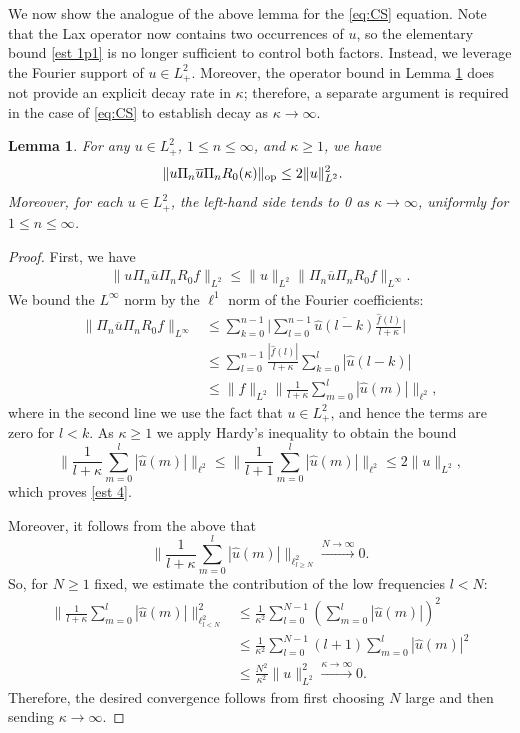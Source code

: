 \documentclass [11pt] {article}
\newtheorem{lem}[thm]{Lemma}
\newcommand{\<}{\langle}
\renewcommand{\>}{\rangle}
\newcommand{\wh}[1]{\widehat{#1}}
\newcommand{\ol}[1]{\overline{#1}}
\newcommand{\op}{\textup{op}}
\begin{document}

We now show the analogue of the above lemma for the \eqref{eq:CS} equation. 
Note that the Lax operator now contains two occurrences of $u$, so the elementary bound \eqref{est 1p1} is no longer sufficient to control both factors. Instead, we leverage the Fourier support of $u\in L^2_+$.  Moreover, the operator bound in Lemma \ref{lem:CS} does not provide an explicit decay rate in $\kappa$; therefore, a separate argument is required in the case of \eqref{eq:CS} to establish decay as $\kappa \to \infty$.

\begin{lem}\label{lem:CS}
For any $u\in L^2_+$, $1\leq n\leq \infty$, and $\kappa\geq 1$, we have
\begin{align}
\| u \Pi_n \ol{u}\Pi_n R_0(\kappa)\|_{\op} &\le 2 \| u\|_{L^2}^2 .
\label{est 4}
\end{align}
Moreover, for each $u\in L^2_+$,
the left-hand side tends to 0 as $\kappa \to \infty$, uniformly for $1\le n\le\infty$.
\end{lem}
\begin{proof}

First, we have
\begin{align*}
\| u \Pi_n \ol u \Pi_n R_0 f\|_{L^2} \le \| u\|_{L^2} \| \Pi_n \ol u \Pi_n R_0 f\|_{L^\infty}.
\end{align*}
We bound the $L^\infty$ norm by the $\ell^1$ norm of the Fourier coefficients:
\begin{align*}
\| \Pi_n \ol u \Pi_n R_0 f\|_{L^\infty} &\le \sum_{k=0}^{n-1} \Bigg|\sum_{l=0}^{n-1} \ol{\wh{u}(l-k)} \frac{\wh{f}(l)}{l+\kappa}\Bigg|\\
&\le  \sum_{l=0}^{n-1}  \frac{|\wh{f}(l)|}{l+\kappa} \sum_{k=0}^{l}|{\wh{u}(l-k)}|\\
&\le \| f\|_{L^2} \Bigg\| \frac{1}{l+\kappa}\sum_{m=0}^{l}|\wh u(m)|\Bigg\|_{\ell^2} ,
\end{align*}
where in the second line we use the fact that $u\in L^2_{+}$, and hence the terms are zero for $l< k$. As $\kappa \ge 1$ we apply Hardy's inequality to obtain the bound
\[
\Bigg\| \frac{1}{l+\kappa}\sum_{m=0}^{l}|\wh u(m)|\Bigg\|_{\ell^2} \le 
\Bigg\| \frac{1}{l+1}\sum_{m=0}^{l}|\wh u(m)|\Bigg\|_{\ell^2} \le 2 \| u\|_{L^2},
\]
which proves \eqref{est 4}.

Moreover, it follows from the above that
\[
\Bigg\| \frac{1}{l+\kappa}\sum_{m=0}^{l}|\wh u(m)|\Bigg\|_{\ell^2_{l\ge N}} \xrightarrow{N \rightarrow \infty} 0.
\]
So, for $N\geq 1$ fixed, we estimate the contribution of the low frequencies $l < N$:
\begin{align*}
\Bigg\| \frac{1}{l+\kappa}\sum_{m=0}^{l}|\wh u(m)|\Bigg\|_{\ell^2_{l< N}}^2 &\le \frac{1}{\kappa^2} \sum_{l=0}^{N-1} \left(\sum_{m=0}^l  |\wh u(m)| \right)^2\\
& \le \frac{1}{\kappa^2} \sum_{l=0}^{N-1} (l+1)\sum_{m=0}^l |\wh u(m)| ^2 \\
&\le \frac{N^2}{\kappa^2} \| u\|_{L^2}^2 \xrightarrow{\kappa \to \infty} 0.
\end{align*}
Therefore, the desired convergence follows from first choosing $N$ large and then sending $\kappa\to\infty$.
\end{proof}
\end{document}
